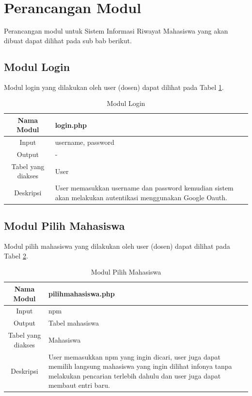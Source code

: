 \section{Perancangan Modul}
\label{sec:perancanganmodul}

Perancangan modul untuk Sistem Informasi Riwayat Mahasiswa yang akan dibuat
dapat dilihat pada sub bab berikut.

\subsection{Modul Login}
Modul login yang dilakukan oleh user (dosen) dapat dilihat pada Tabel
\ref{tab:modullogin}.

\begin{table}[h]
\centering
\caption[Tabel 4-1 Modul Login]{Modul Login}
\label{tab:modullogin}
\begin{tabular}{|c|p{7cm}|}
\hline
Nama Modul & login.php\\
\hline
Input & username, password\\
\hline
Output & -\\
\hline
Tabel yang diakses & User\\
\hline
Deskripsi & User memasukkan username dan password kemudian sistem akan melakukan
autentikasi menggunakan Google Oauth.\\
\hline
\end{tabular}
\end{table}

\subsection{Modul Pilih Mahasiswa}
Modul pilih mahasiswa yang dilakukan oleh user (dosen) dapat dilihat pada Tabel
\ref{tab:modulpilihmahasiswa}.

\begin{table}[h]
\centering
\caption[Tabel 4-2 Modul Pilih Mahasiswa]{Modul Pilih Mahasiswa}
\label{tab:modulpilihmahasiswa}
\begin{tabular}{|c|p{7cm}|}
\hline
Nama Modul & pilihmahasiswa.php\\
\hline
Input & npm\\
\hline
Output & Tabel mahasiswa\\
\hline
Tabel yang diakses & Mahasiswa\\
\hline
Deskripsi & User memasukkan npm yang ingin dicari, user juga dapat memilih
langsung mahasiswa yang ingin dilihat infonya tanpa melakukan pencarian terlebih
dahulu dan user juga dapat membaut entri baru.\\
\hline
\end{tabular}
\end{table}

